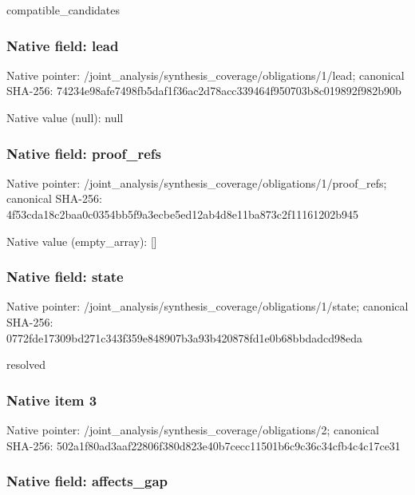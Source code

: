 \documentclass[10pt,a4paper]{article}
\begin{document}
compatible\_candidates


\subsubsection{Native field: lead}


Native pointer: /joint\_analysis/synthesi\allowbreak{}s\_coverage/obligations/1\allowbreak{}/lead; canonical SHA-256: 74234e98afe7498fb5daf1f3\allowbreak{}6ac2d78acc339464f950703b\allowbreak{}8c019892f982b90b



Native value (null): null



\subsubsection{Native field: proof\_refs}


Native pointer: /joint\_analysis/synthesi\allowbreak{}s\_coverage/obligations/1\allowbreak{}/proof\_refs; canonical SHA-256: 4f53cda18c2baa0c0354bb5f\allowbreak{}9a3ecbe5ed12ab4d8e11ba87\allowbreak{}3c2f11161202b945



Native value (empty\_array): []



\subsubsection{Native field: state}


Native pointer: /joint\_analysis/synthesi\allowbreak{}s\_coverage/obligations/1\allowbreak{}/state; canonical SHA-256: 0772fde17309bd271c343f35\allowbreak{}9e848907b3a93b420878fd1e\allowbreak{}0b68bbdadcd98eda


resolved


\subsubsection{Native item 3}


Native pointer: /joint\_analysis/synthesi\allowbreak{}s\_coverage/obligations/2; canonical SHA-256: 502a1f80ad3aaf22806f380d\allowbreak{}823e40b7cecc11501b6c9c36\allowbreak{}c34cfb4c4c17ce31



\subsubsection{Native field: affects\_gap}
\end{document}
